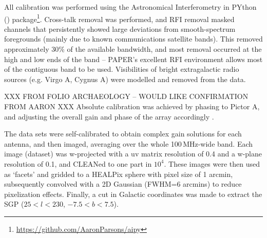 \documentclass[useAMS,usenatbib]{mn2e}
\begin{document}
All calibration was performed using the Astronomical Interferometry in PYthon ({}) package\footnote{\url{https://github.com/AaronParsons/aipy}}.
Cross-talk removal was performed, and RFI removal masked channels that persistently showed large deviations from smooth-spectrum foregrounds (mainly due to known communications satellite bands). This removed approximately 30\% of the available bandwidth, and most removal occurred at the high and low ends of the band -- PAPER's excellent RFI environment allows most of the contiguous band to be used. Visibilities of bright extragalactic radio sources (e.g. Virgo A, Cygnus A) were modelled and removed from the data. 

XXX FROM FOLIO ARCHAEOLOGY -- WOULD LIKE CONFIRMATION FROM AARON XXX
Absolute calibration was achieved by phasing to Pictor A, and adjusting the overall gain and phase of the array accordingly \citep{Jacobs.13}.

The data sets were self-calibrated to obtain complex gain solutions for each antenna, and then imaged, averaging over the whole 100\,MHz-wide band. Each image (dataset) was w-projected with a uv matrix resolution of 0.4 and a w-plane resolution of 0.1, and CLEANed \citep{Clark.80} to one part in $10^4$. These images were then used as `facets' and gridded to a HEALPix \citep{Gorski.05, Gorski.11} sphere with pixel size of 1 arcmin, subsequently convolved with a 2D Gaussian (FWHM=6 arcmins) to reduce pixelization effects. Finally, a cut in Galactic coordinates was made to extract the SGP ($25<l<230$, $-7.5<b<7.5$).



\end{document}
